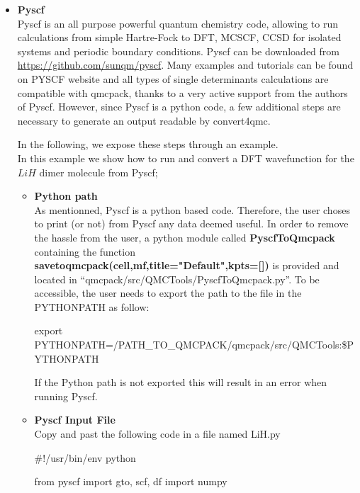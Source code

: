 \begin{itemize}
\item \textbf{Pyscf}\\
Pyscf\cite{Sun2018} is an all purpose powerful quantum chemistry code, allowing to run calculations from simple Hartre-Fock to DFT, MCSCF, CCSD for isolated systems and periodic boundary conditions. Pyscf can be downloaded from \url{https://github.com/sunqm/pyscf}. Many examples and tutorials can be found on PYSCF website and all types of single determinants calculations are compatible with qmcpack, thanks to a very active support from the authors of Pyscf. However, since Pyscf is a python code, a few additional steps are necessary to generate an output readable by convert4qmc. 


In the following, we expose these steps through an example.\\

In this example we show how to run and convert a DFT wavefunction for the $LiH$ dimer molecule from Pyscf;\\

\begin{itemize}
 \item \textbf{Python path}\\
As mentionned, Pyscf is a python based code. Therefore, the user choses to print (or not) from Pyscf any data deemed useful. In order to remove the hassle from the user, a python module called \textbf{PyscfToQmcpack} containing the function \textbf{savetoqmcpack(cell,mf,title="Default",kpts=[])} is provided and located in ``qmcpack/src/QMCTools/PyscfToQmcpack.py''. To be accessible, the user needs to export the path to the file in the PYTHONPATH as follow:\\
\begin{shade}
 export PYTHONPATH=/PATH_TO_QMCPACK/qmcpack/src/QMCTools:\$PYTHONPATH
\end{shade}

If the Python path is not exported this will result in an error when running Pyscf.


 \item \textbf{Pyscf Input File}\\
 
Copy and past the following code in a file named LiH.py
 \begin{shade}
#!/usr/bin/env python



from pyscf import gto, scf, df                                                                                                    
import  numpy


\end{shade}
\end{itemize}
\end{itemize}
